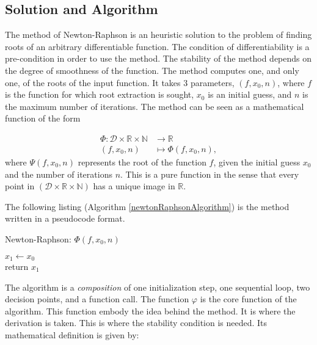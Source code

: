 \documentclass[12pt]{article}
\begin{document}
 	 \subsection {Solution and Algorithm}
  		The method of Newton-Raphson is an heuristic solution to the problem of finding roots of an arbitrary differentiable function. 
  		The condition of differentiability is a pre-condition in order to use the method.  The stability of the method depends on the degree of smoothness of the function.
  		The method computes one, and only one, of the roots of the input function.  
  		It takes 3 parameters, \( (f,x_0,n) \), where \(f\) is the function for which root extraction is sought, 
  		\(x_0\) is an initial guess, and \(n\) is the maximum number of iterations.  The method can be seen as a mathematical function of the form
  
  		\begin{align} \label{eq:functional}
   			\Phi \colon  \mathcal{D} \times \mathbb{R} \times \mathbb{N}  &\to \mathbb{R} \nonumber\\
   			(f,x_0,n) &\mapsto \Phi(f,x_0,n),
  		\end{align}
	  where \( \Psi (f,x_0,n)\) represents the root of the function \( f\), given the initial guess \(x_0\) and the number of iterations \(n\).  
  	This is a pure function in the sense that every point in \(  (\mathcal{D} \times \mathbb{R} \times \mathbb{N} )\) has a unique image in \( \mathbb{R} \).
  
  	The following listing (Algorithm \ref {newtonRaphsonAlgorithm}) is the method written in a pseudocode format.
  
    	\begin{algorithm}[H]
     	\caption{Newton-Raphson: $\Phi (f,x_0,n)$}
     	\label {newtonRaphsonAlgorithm}
    		$x_1 \gets x_0$ \\
    		return $x_1$
    \end{algorithm}
    
  	The algorithm is a \textit{composition} of one initialization step, one sequential loop, two decision points, and a function call.
  	The function \(\varphi\) is the core function of the algorithm.  This function embody the idea behind the method. 
  	It is where the derivation is taken. This is where the stability condition is needed.  Its mathematical definition is given by:
  
\end{document}
